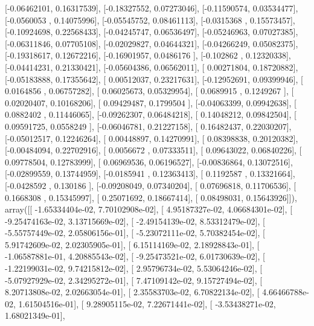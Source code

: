 \documentclass{article}
\begin{document}
       [-0.06462101,  0.16317539],
       [-0.18327552,  0.07273046],
       [-0.11590574,  0.03534477],
       [-0.0560053 ,  0.14075996],
       [-0.05545752,  0.08461113],
       [-0.0315368 ,  0.15573457],
       [-0.10924698,  0.22568433],
       [-0.04245747,  0.06536497],
       [-0.05246963,  0.07027385],
       [-0.06311846,  0.07705108],
       [-0.02029827,  0.04644321],
       [-0.04266249,  0.05082375],
       [-0.19318617,  0.12672216],
       [-0.16901957,  0.0486176 ],
       [-0.102862  ,  0.12320338],
       [-0.04414231,  0.21330421],
       [-0.05604386,  0.06562011],
       [ 0.00271804,  0.18720882],
       [-0.05183888,  0.17355642],
       [ 0.00512037,  0.23217631],
       [-0.12952691,  0.09399946],
       [ 0.0164856 ,  0.06757282],
       [ 0.06025673,  0.05329954],
       [ 0.0689915 ,  0.1249267 ],
       [ 0.02020407,  0.10168206],
       [ 0.09429487,  0.1799504 ],
       [-0.04063399,  0.09942638],
       [ 0.0882402 ,  0.11446065],
       [-0.09262307,  0.06484218],
       [ 0.14048212,  0.09842504],
       [ 0.09591725,  0.0558249 ],
       [-0.06046781,  0.21227158],
       [ 0.16482437,  0.22030207],
       [-0.05012517,  0.12246264],
       [ 0.00448897,  0.14270991],
       [ 0.08398838,  0.20120382],
       [-0.00484094,  0.22702916],
       [ 0.0056672 ,  0.07333511],
       [ 0.09643022,  0.06840226],
       [ 0.09778504,  0.12783999],
       [ 0.06969536,  0.06196527],
       [-0.00836864,  0.13072516],
       [-0.02899559,  0.13744959],
       [-0.0185941 ,  0.12363413],
       [ 0.1192587 ,  0.13321664],
       [-0.0428592 ,  0.130186  ],
       [-0.09208049,  0.07340204],
       [ 0.07696818,  0.11706536],
       [ 0.1668308 ,  0.15345997],
       [ 0.25071692,  0.18667414],
       [ 0.08498031,  0.15643926]]), array([[ -1.65334404e-02,   7.70102908e-02],
       [  4.95187327e-02,   4.06684301e-02],
       [ -9.25474163e-02,   3.13715669e-02],
       [ -2.49154139e-02,   8.53312479e-02],
       [ -5.55757449e-02,   2.05806156e-01],
       [ -5.23072111e-02,   5.70382454e-02],
       [  5.91742609e-02,   2.02305905e-01],
       [  6.15114169e-02,   2.18928843e-01],
       [ -1.06587881e-01,   4.20885543e-02],
       [ -9.25473521e-02,   6.01730639e-02],
       [ -1.22199031e-02,   9.74215812e-02],
       [  2.95796734e-02,   5.53064246e-02],
       [ -5.07927929e-02,   2.34295272e-01],
       [  7.47109142e-02,   9.15727494e-02],
       [  8.20713808e-02,   2.02663054e-01],
       [  2.35583703e-02,   6.70822134e-02],
       [  4.66466788e-02,   1.61504516e-01],
       [  9.28905115e-02,   7.22671441e-02],
       [ -3.53438271e-02,   1.68021349e-01],
\end{document}
